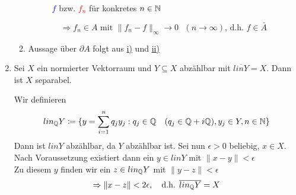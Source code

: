 \begin{beispiel}
\begin{enumerate}[label=\alph*\upshape)]
\begin{beweis}
\begin{enumerate}
						\begin{center}
						  \begin{figure}[H]
							\begin{center}		
							\end{center}
							\caption{\textcolor{blue}{$f$} bzw. \textcolor{red}{$f_{n}$} für konkretes $n \in \mathbb{N}$}
						  \end{figure}
						\end{center}
						\[ \Rightarrow f_{n} \in A \text{ mit } \| f_{n} - f \|_{\infty} \rightarrow 0 \text{ } (n \rightarrow \infty) \text{, d.h. } f \in \bar A \]
					\item Aussage über $\partial A$ folgt aus \hyperref[bsp:4.11.b]{i)} und \hyperref[bsp:4.11.b]{ii)}
				\end{enumerate}
			\end{beweis}
		\item Sei $X$ ein normierter Vektorraum und $Y \subseteq X$ abzählbar mit $\overline{lin Y} = X$. Dann ist $X$ separabel.
			\begin{beweis}
				Wir definieren
				\[ lin_{\mathbb{Q}} Y \coloneqq \{ y = \sum_{i = 1}^{n} q_{j} y_{j} : q_{j} \in \mathbb{Q} \quad (q_{j} \in \mathbb{Q} + i \mathbb{Q} ), y_{j} \in Y, n \in \mathbb{N} \} \]
				Dann ist $lin Y$ abzählbar, da $Y$ abzählbar ist. Sei nun $\epsilon > 0$ beliebig, $x \in X$. \\
				Nach Voraussetzung existiert dann ein $y \in lin Y$ mit $\| x - y \| < \epsilon$ \\
				Zu diesem $y$ finden wir ein $z \in lin_{\mathbb{Q}} Y$ mit $\| y - z \| < \epsilon$
				\[ \Rightarrow \| x - z \| < 2 \epsilon, \quad \text{d.h. } \overline{lin_{\mathbb{Q}} Y} = X \]
			\end{beweis}

\end{enumerate}
\end{beispiel}

